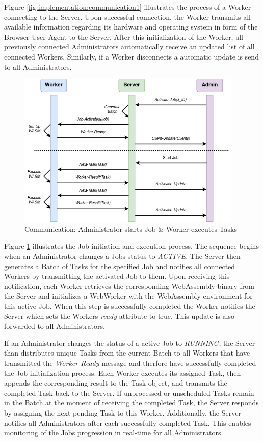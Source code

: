 Figure \ref{fig:implementation:communication1} illustrates the process of a Worker connecting to the Server. Upon successful connection, the Worker transmits all available information regarding its hardware and operating system in form of the Browser User Agent to the Server. After this initialization of the Worker, all previously connected Administrators automatically receive an updated list of all connected Workers. Similarly, if a Worker disconnects a automatic update is send to all Administrators.

\begin{figure}[htbp]
    \centering
    \includegraphics[width=0.95\textwidth]{gfx/figures/communication-jobexecution.png}
    \caption{Communication: Administrator starts Job \& Worker executes Tasks}
    \label{fig:implementation:communication2}
\end{figure}

Figure \ref{fig:implementation:communication2} illustrates the Job initiation and execution process. The sequence begins when an Administrator changes a Jobs status to \emph{ACTIVE}. The Server then generates a Batch of Tasks for the specified Job and notifies all connected Workers by transmitting the activated Job to them. Upon receiving this notification, each Worker retrieves the corresponding WebAssembly binary from the Server and initializes a WebWorker with the WebAssembly environment for this active Job. When this step is successfully completed the Worker notifies the Server which sets the Workers \emph{ready} attribute to true. This update is also forwarded to all Administrators.

If an Administrator changes the status of a active Job to \emph{RUNNING}, the Server than distributes unique Tasks from the current Batch to all Workers that have transmitted the \emph{Worker Ready} message and therfore have successfully completed the Job initialization process. Each Worker executes its assigned Task, then appends the corresponding result to the Task object, and transmits the completed Task back to the Server. If unprocessed or unscheduled Tasks remain in the Batch at the moment of receiving the completed Task, the Server responds by assigning the next pending Task to this Worker. Additionally, the Server notifies all Administrators after each successfully completed Task. This enables monitoring of the Jobs progression in real-time for all Administrators.

